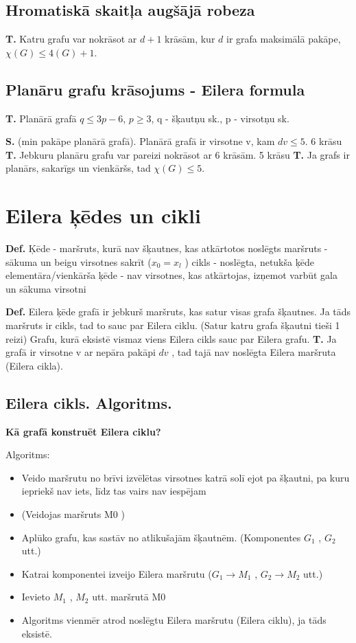 \documentclass{article}
\begin{document}
\subsection{Hromatiskā skaitļa augšājā robeza}
\textbf{T. } Katru grafu var nokrāsot ar $d + 1$ krāsām, kur $d$ ir grafa maksimālā pakāpe, $\chi(G ) \le 4(G ) + 1$.

\subsection{Planāru grafu krāsojums - Eilera formula}

\textbf{T.} Planārā grafā $q \le 3p − 6$, $p \ge 3$, q - šķautņu sk., p - virsotņu sk.

\textbf{S. }(min pakāpe planārā grafā). Planārā grafā ir virsotne v, kam $dv \le 5$.
6 krāsu \textbf{T. }Jebkuru planāru grafu var pareizi nokrāsot ar 6 krāsām.
5 krāsu \textbf{T. }Ja grafs ir planārs, sakarīgs un vienkāršs, tad $\chi(G ) \le 5$.

\section{Eilera ķēdes un cikli}

\textbf{Def.} Ķēde - maršruts, kurā nav šķautnes, kas atkārtotos
noslēgts maršruts - sākuma un beigu virsotnes sakrīt ($x_0 = x_l$ )
cikls - noslēgta, netukša ķēde
elementāra/vienkārša ķēde - nav virsotnes, kas atkārtojas, izņemot
varbūt gala un sākuma virsotni

\textbf{Def.}  Eilera ķēde grafā ir jebkurš maršruts, kas satur visas grafa šķautnes.
Ja tāds maršruts ir cikls, tad to sauc par Eilera ciklu. (Satur katru grafa šķautni tieši 1 reizi) Grafu, kurā eksistē vismaz viens Eilera cikls sauc par Eilera grafu.
\textbf{T. } Ja grafā ir virsotne v ar nepāra pakāpi $dv$ , tad tajā nav noslēgta Eilera maršruta (Eilera cikla).

\subsection{Eilera cikls. Algoritms.}
\textbf{Kā grafā konstruēt Eilera ciklu?}

Algoritms:
\begin{itemize}
	\item Veido maršrutu no brīvi izvēlētas virsotnes katrā solī ejot pa šķautni, pa kuru iepriekš nav iets, līdz tas vairs nav iespējam
	\item (Veidojas maršruts M0 )
	\item Aplūko grafu, kas sastāv no atlikušajām šķautnēm. (Komponentes $G_1$ , $G_2$ utt.)
	\item Katrai komponentei izveijo Eilera maršrutu ($G_1 → M_1$ , $G_2 → M_2 $ utt.)
	\item Ievieto $M_1$ , $M_2$ utt. maršrutā M0
	\item Algoritms vienmēr atrod noslēgtu Eilera maršrutu (Eilera ciklu), ja tāds eksistē.
\end{itemize}
\end{document}
